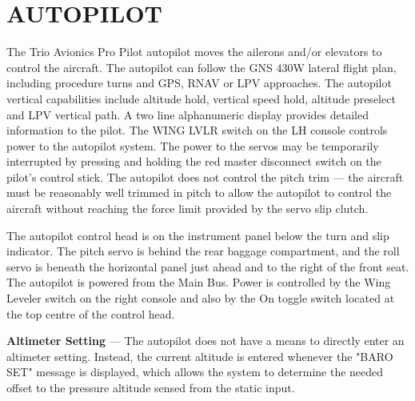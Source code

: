 \section{AUTOPILOT} 

The Trio Avionics Pro Pilot autopilot moves the ailerons and/or elevators to control the aircraft. The autopilot can follow the GNS 430W lateral flight plan, including procedure turns and GPS, RNAV or LPV approaches. The autopilot vertical capabilities include altitude hold, vertical speed hold, altitude preselect and LPV vertical path. A two line alphanumeric display provides detailed information to the pilot. The WING LVLR switch on the LH console controls power to the autopilot system. The power to the servos may be temporarily interrupted by pressing and holding the red master disconnect switch on the pilot's control stick. The autopilot does not control the pitch trim --- the aircraft must be reasonably well trimmed in pitch to allow the autopilot to control the aircraft without reaching the force limit provided by the servo slip clutch. %

The autopilot control head is on the instrument panel below the turn and slip indicator. The pitch servo is behind the rear baggage compartment, and the roll servo is beneath the horizontal panel just ahead and to the right of the front seat. The autopilot is powered from the Main Bus. Power is controlled by the Wing Leveler switch on the right console and also by the On toggle switch located at the top centre of the control head.

\textbf{Altimeter Setting} --- The autopilot does not have a means to directly enter an altimeter setting.  Instead, the current altitude is entered whenever the "BARO SET" message is displayed, which allows the system to determine the needed offset to the pressure altitude sensed from the static input.

